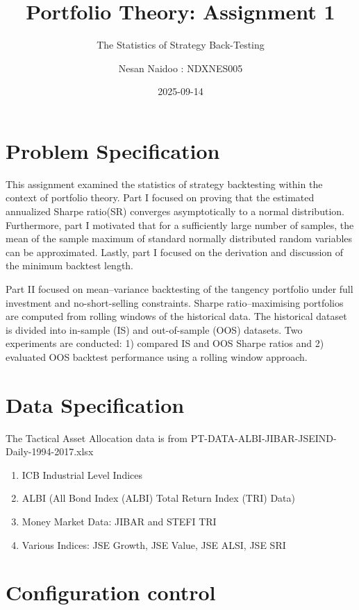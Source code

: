 \documentclass[
  12pt,
]{article}
\title{Portfolio Theory: Assignment 1}
\subtitle{The Statistics of Strategy Back-Testing}
\author{Nesan Naidoo : NDXNES005}
\date{2025-09-14}
\begin{document}
\maketitle

\section{Problem Specification}\label{problem-specification}

This assignment examined the statistics of strategy backtesting within
the context of portfolio theory. Part I focused on proving that the
estimated annualized Sharpe ratio(SR) converges asymptotically to a
normal distribution. Furthermore, part I motivated that for a
sufficiently large number of samples, the mean of the sample maximum of
standard normally distributed random variables can be approximated.
Lastly, part I focused on the derivation and discussion of the minimum
backtest length.

Part II focused on mean--variance backtesting of the tangency portfolio
under full investment and no-short-selling constraints. Sharpe
ratio--maximising portfolios are computed from rolling windows of the
historical data. The historical dataset is divided into in-sample (IS)
and out-of-sample (OOS) datasets. Two experiments are conducted: 1)
compared IS and OOS Sharpe ratios and 2) evaluated OOS backtest
performance using a rolling window approach.

\section{Data Specification}\label{data-specification}

The Tactical Asset Allocation data is from
PT-DATA-ALBI-JIBAR-JSEIND-Daily-1994-2017.xlsx

\begin{enumerate}
\def\labelenumi{\arabic{enumi}.}
\item
  ICB Industrial Level Indices
\item
  ALBI (All Bond Index (ALBI) Total Return Index (TRI) Data)
\item
  Money Market Data: JIBAR and STEFI TRI
\item
  Various Indices: JSE Growth, JSE Value, JSE ALSI, JSE SRI
\end{enumerate}

\section{Configuration control}\label{configuration-control}
\end{document}
